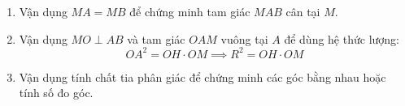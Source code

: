 \begin{enumerate}
\item Vận dụng $MA = MB$ để chứng minh tam giác $MAB$ cân tại $M$.
\item Vận dụng $MO \perp AB$ và tam giác $OAM$ vuông tại $A$ để dùng hệ thức lượng:
$$OA^2 = OH \cdot OM \implies \boxed{R^2 = OH \cdot OM}$$
\item Vận dụng tính chất tia phân giác để chứng minh các góc bằng nhau hoặc tính số đo góc.
\end{enumerate}
